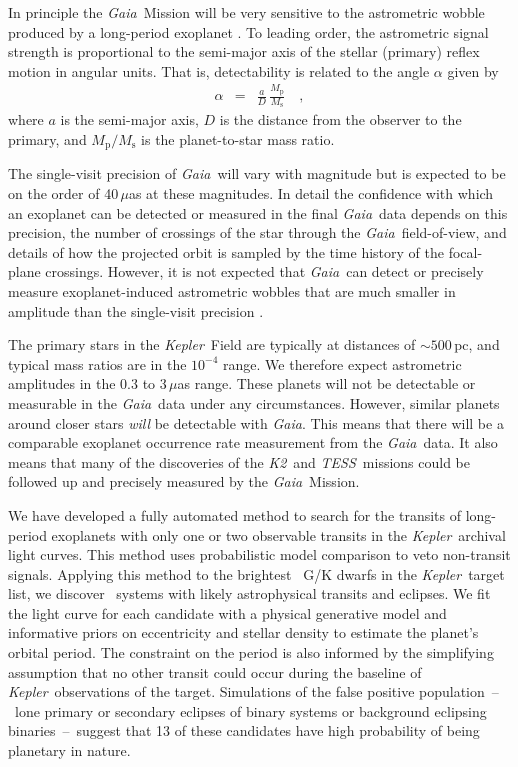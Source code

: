 \documentclass[manuscript, letterpaper]{aastex6}
\makeatletter
\let\origsection\section
\renewcommand\section{\@ifstar{\starsection}{\nostarsection}}
\newcommand\nostarsection[1]{\sectionprelude\origsection{#1}}
\newcommand\starsection[1]{\sectionprelude\origsection*{#1}}
\newcommand\sectionprelude{\vspace{1em}}
\newcommand{\project}[1]{\textsl{#1}}
\newcommand{\kepler}{\project{Kepler}}
\newcommand{\KT}{\project{K2}}
\newcommand{\tess}{\project{TESS}}
\newcommand{\gaia}{\project{Gaia}}
\newcommand{\sectlabel}[1]{\label{sect:#1}}
\makeatother
\begin{document}
In principle the \gaia\ Mission will be very sensitive to the astrometric
wobble produced by a long-period exoplanet \citep{Perryman:2014}.
To leading order, the astrometric signal strength is proportional to the
semi-major axis of the stellar (primary) reflex motion in angular units.
That is, detectability is related to the angle $\alpha$ given by
\begin{eqnarray}
\alpha &=& \frac{a}{D}\,\frac{M_{\mathrm p}}{M_{\mathrm s}} \quad ,
\end{eqnarray}
where $a$ is the semi-major axis, $D$ is the distance from the observer to the
primary, and $M_{\mathrm{p}}/M_{\mathrm{s}}$ is the planet-to-star mass ratio.

The single-visit precision of \gaia\ will vary with magnitude but is expected
to be on the order of 40\,$\mu$as at these magnitudes.
In detail the confidence with which an exoplanet can be detected or measured
in the final \gaia\ data depends on this precision, the number of crossings of
the star through the \gaia\ field-of-view, and details of how the projected
orbit is sampled by the time history of the focal-plane crossings.
However, it is not expected that \gaia\ can detect or precisely measure
exoplanet-induced astrometric wobbles that are much smaller in amplitude than
the single-visit precision \citep{Perryman:2014}.

The primary stars in the \kepler\  Field are typically at distances of $\sim
500$\,pc, and typical mass ratios are in the $10^{-4}$ range.
We therefore expect astrometric amplitudes in the 0.3 to 3\,$\mu$as range.
These planets will not be detectable or measurable in the \gaia\ data under
any circumstances.
However, similar planets around closer stars \emph{will} be detectable with
\gaia.
This means that there will be a comparable exoplanet occurrence rate
measurement from the \gaia\ data.
It also means that many of the discoveries of the \KT\ and \tess\ missions
could be followed up and precisely measured by the \gaia\ Mission.


\section{Summary}\sectlabel{summary}

We have developed a fully automated method to search for the transits of
long-period exoplanets with only one or two observable transits in the
\kepler\ archival light curves.
This method uses probabilistic model comparison to veto non-transit signals.
Applying this method to the brightest \numtargets\ G/K dwarfs in the \kepler\
target list, we discover \numcands\ systems with likely astrophysical
transits and eclipses.
We fit the light curve for each candidate with a physical generative model and
informative priors on eccentricity and stellar density to estimate the
planet's orbital period.
The constraint on the period is also informed by the simplifying assumption
that no other transit could occur during the baseline of \kepler\ observations
of the target.
Simulations of the false positive population~--~lone primary or secondary
eclipses of binary systems or background eclipsing binaries~--~suggest that 13
of these candidates have high probability of being planetary in nature.
\end{document}
